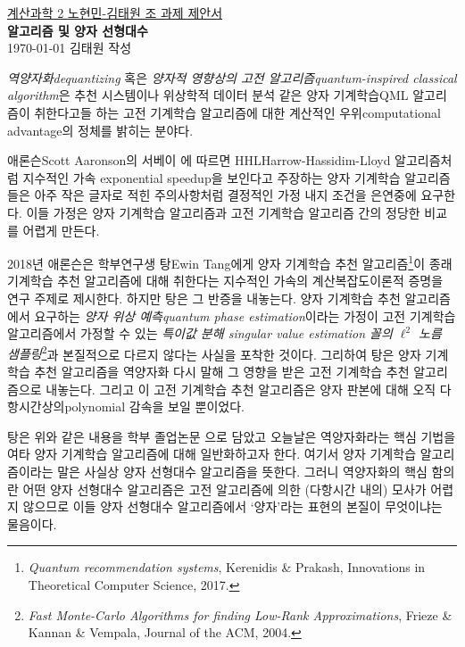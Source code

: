 \documentclass[a4paper,hidelinks]{oblivoir}
\begin{document}
\thispagestyle{empty}
\begin{center}
  \underline{계산과학 2 노현민-김태원 조 과제 제안서} \\
  \textbf{ 알고리즘 및 양자 선형대수} \\ 
  \today\; 김태원 작성
\end{center}
\emph{역양자화\footnotesize dequantizing} 혹은 \emph{양자적 영향상의
고전 알고리즘\footnotesize quantum-inspired classical algorithm}은 추천
시스템이나 위상학적 데이터 분석 같은 양자 기계학습{\footnotesize QML}
알고리즘이 취한다고들 하는 고전 기계학습 알고리즘에 대한 계산적인 
우위{\footnotesize computational advantage}의 정체를 밝히는 분야다.

애론슨{\footnotesize Scott Aaronson}의 서베이 에 따르면
HHL{\footnotesize Harrow-Hassidim-Lloyd} 알고리즘처럼 지수적인 가속{\footnotesize
exponential speedup}을 보인다고 주장하는 양자 기계학습 알고리즘들은 아주
작은 글자로 적힌 주의사항처럼 결정적인 가정 내지 조건을 은연중에 요구한다.
이들 가정은 양자 기계학습 알고리즘과 고전 기계학습 알고리즘 간의 정당한
비교를 어렵게 만든다.

2018년 애론슨은 학부연구생 탕{\footnotesize Ewin Tang}에게
양자 기계학습 추천 알고리즘\footnote{\emph{Quantum recommendation systems},
  Kerenidis \& Prakash, Innovations in Theoretical Computer Science, 
2017.}이 종래 기계학습 추천 알고리즘에 대해 취한다는 지수적인 가속의
계산복잡도이론적 증명을 연구 주제로 제시한다. 하지만 탕은 그 반증을
내놓는다. 양자 기계학습 추천 알고리즘에서 요구하는 \emph{양자 위상
예측\footnotesize quantum phase estimation}이라는 가정이 고전 기계학습
알고리즘에서 가정할 수 있는 \emph{특이값 분해{\footnotesize
singular value estimation} 꼴의 $\ell^2$ 노름 샘플링}\footnote{\emph{Fast
Monte-Carlo Algorithms for finding Low-Rank Approximations}, Frieze \& Kannan
\& Vempala, Journal of the ACM, 2004.}과 본질적으로 다르지 않다는 사실을 포착한
것이다. 그리하여 탕은 양자 기계학습 추천 알고리즘을 역양자화 다시 말해 그 영향을
받은 고전 기계학습 추천 알고리즘으로 내놓는다. 그리고 이 고전 기계학습 추천
알고리즘은 양자 판본에 대해 오직 다항시간상의{\tiny polynomial} 감속을 보일
뿐이었다.

탕은 위와 같은 내용을 학부 졸업논문 으로 담았고 오늘날은 역양자화라는 핵심
기법을 여타 양자 기계학습 알고리즘에 대해 일반화하고자 한다. 여기서 양자 기계학습 
알고리즘이라는 말은 사실상 양자 선형대수 알고리즘을 뜻한다. 그러니 역양자화의
핵심 함의란 어떤 양자 선형대수 알고리즘은 고전 알고리즘에 의한 (다항시간 내의) 
모사가 어렵지 않으므로 이들 양자 선형대수 알고리즘에서 `양자'라는 표현의 본질이
무엇이냐는 물음이다. 
\end{document}
